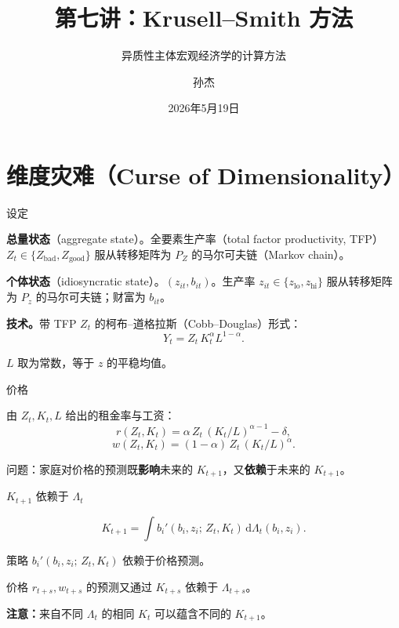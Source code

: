 \documentclass[10pt,aspectratio=169]{beamer}
\title{第七讲：Krusell--Smith 方法}
\subtitle{异质性主体宏观经济学的计算方法}
\author{孙杰}
\institute{多伦多大学}
\date{2026年5月19日}
\begin{document}
\maketitle

\section[维度灾难]{维度灾难（Curse of Dimensionality）}

\begin{frame}{设定}

\textbf{总量状态}（aggregate state）。全要素生产率（total factor productivity, TFP）$Z_t \in \{Z_{\text{bad}}, Z_{\text{good}}\}$ 服从转移矩阵为 $P_Z$ 的马尔可夫链（Markov chain）。

\smallskip

\textbf{个体状态}（idiosyncratic state）。$(z_{it}, b_{it})$。生产率 $z_{it} \in \{z_{\text{lo}}, z_{\text{hi}}\}$ 服从转移矩阵为 $P_z$ 的马尔可夫链；财富为 $b_{it}$。

\smallskip

\textbf{技术。}带 TFP $Z_t$ 的柯布--道格拉斯（Cobb--Douglas）形式：
\[
  Y_t = Z_t\, K_t^{\alpha} L^{1-\alpha}.
\]

\smallskip

$L$ 取为常数，等于 $z$ 的平稳均值。

\end{frame}

\begin{frame}{价格}

由 $Z_t, K_t, L$ 给出的租金率与工资：
\[
  r(Z_t, K_t) = \alpha\, Z_t\, (K_t/L)^{\alpha-1} - \delta,
\]
\[
  w(Z_t, K_t) = (1-\alpha)\, Z_t\, (K_t/L)^{\alpha}.
\]

\smallskip

问题：家庭对价格的预测既\textbf{影响}未来的 $K_{t+1}$，又\textbf{依赖}于未来的 $K_{t+1}$。

\end{frame}

\begin{frame}{$K_{t+1}$ 依赖于 $\Lambda_t$}

\[
  K_{t+1} = \int b_i'(b_i, z_i;\, Z_t, K_t)\, \mathrm d\Lambda_t(b_i, z_i).
\]

\smallskip

策略 $b_i'(b_i, z_i;\, Z_t, K_t)$ 依赖于价格预测。

价格 $r_{t+s}, w_{t+s}$ 的预测又通过 $K_{t+s}$ 依赖于 $\Lambda_{t+s}$。

\smallskip

\textbf{注意：}来自不同 $\Lambda_t$ 的相同 $K_t$ 可以蕴含不同的 $K_{t+1}$。

\end{frame}
\end{document}
